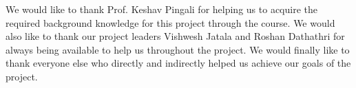 \documentclass[sigplan,10pt,screen]{acmart}
\begin{document}

\maketitle

{









\begin{acks}                            %
  We would like to thank Prof. Keshav Pingali for helping us to acquire the required background knowledge for this project through the course. We would also like to thank our project leaders Vishwesh Jatala and Roshan Dathathri for always being available to help us throughout the project. We would finally like to thank everyone else who directly and indirectly helped us achieve our goals of the project. 
\end{acks}
}

\newpage




%
\end{document}
